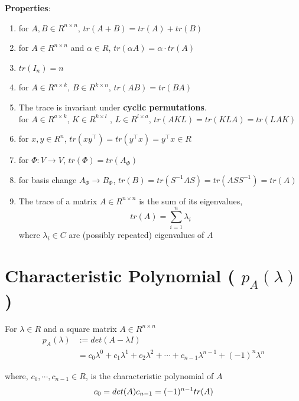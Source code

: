 \noindent\textbf{Properties}:
\begin{enumerate}
    \item for $A, B \in  R^{n\times n}$,  $tr(A + B) = tr(A) + tr(B)$

    \item for $A \in  R^{n\times n}$ and $\alpha  \in  R$,  $tr(\alpha A) = \alpha\cdot tr(A)$

    \item $tr(I_n) = n$

    \item for $A \in  R^{n\times k}$, $B \in  R^{k\times n}$, $tr(AB) = tr(BA)$

    \item The trace is invariant under \textbf{cyclic permutations}.\\
    for $A \in  R^{a\times k}$, $K \in  R^{k\times l}$ , $L \in  R^{l\times a}$, $tr(AKL) = tr(KLA) = tr(LAK)$

    \item for $x, y \in  R^n$, $tr(xy^\top ) = tr(y^\top x) = y^\top x \in  R$

    \item for $\Phi  : V \to  V$, $tr(\Phi ) = tr(A_\Phi )$

    \item for basis change $A_\Phi  \to  B_\Phi$, $tr(B) = tr(S^{-1}AS) = tr(ASS^{-1}) = tr(A)$

    \item The trace of a matrix $A \in  R^{n\times n}$ is the sum of its eigenvalues,
    \[
        tr(A) = \sum_{i=1}^{n} \lambda_{i}
    \]
    where $\lambda_i \in  C$ are (possibly repeated) eigenvalues of $A$

\end{enumerate}

\section{Characteristic Polynomial ( $p_A(\lambda)$ )}\label{Characteristic Polynomial}

For $\lambda \in R$ and a square matrix $A \in R^{n\times n}$ 
\begin{align*}
    p_A(\lambda) &:= det(A - \lambda I)\\
        &= c_0\lambda^0 + c_1\lambda^1  + c_2\lambda^ 2 + \cdots  + c_{n-1}\lambda^{n-1} + (-1)^n\lambda^n
\end{align*}

where, $c_0, \cdots  , c_{n-1} \in R$, is the characteristic polynomial of $A$
\[
    \hfill
    c_0 = det(A)
    \hfill
    c_{n-1} = (-1)^{n-1}tr(A)
    \hfill
\]


